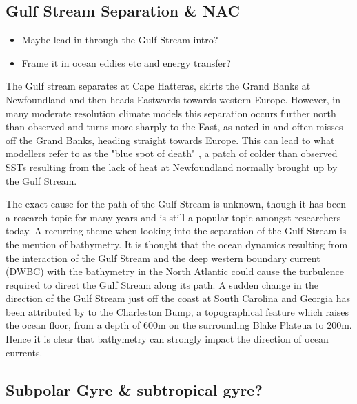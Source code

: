 \documentclass[..\EOYR.tex]{subfiles}
\begin{document}

\subsection{Gulf Stream Separation \& NAC}
\begin{itemize}
    \item Maybe lead in through the Gulf Stream intro?
    \item Frame it in ocean eddies etc and energy transfer?
\end{itemize}

The Gulf stream separates at Cape Hatteras, skirts the Grand Banks at Newfoundland and then heads Eastwards towards western Europe. However, in many moderate resolution climate models this separation occurs further north than observed and turns more sharply to the East, as noted in \citep{Hurlburt2008} and often misses off the Grand Banks, heading straight towards Europe. This can lead to what modellers refer to as the "blue spot of death" \citep{Gnanadesikan2007}, a patch of colder than observed SSTs resulting from the lack of heat at Newfoundland normally brought up by the Gulf Stream.

The exact cause for the path of the Gulf Stream is unknown, though it has been a research topic for many years and is still a popular topic amongst researchers today. A recurring theme when looking into the separation of the Gulf Stream is the mention of bathymetry. It is thought \citep{Gula2014}\citep{NaveiraGarabato2013}\citep{Nikurashin2012a} that the ocean dynamics resulting from the interaction of the Gulf Stream and the deep western boundary current (DWBC) with the bathymetry in the North Atlantic could cause the turbulence required to direct the Gulf Stream along its path. A sudden change in the direction of the Gulf Stream just off the coast at South Carolina and Georgia has been attributed by \citep{Gula2014} to the Charleston Bump, a topographical feature which raises the ocean floor, from a depth of 600m on the surrounding Blake Plateua to 200m. Hence it is clear that bathymetry can strongly impact the direction of ocean currents.


\subsection{Subpolar Gyre \& subtropical gyre?}
\end{document}

